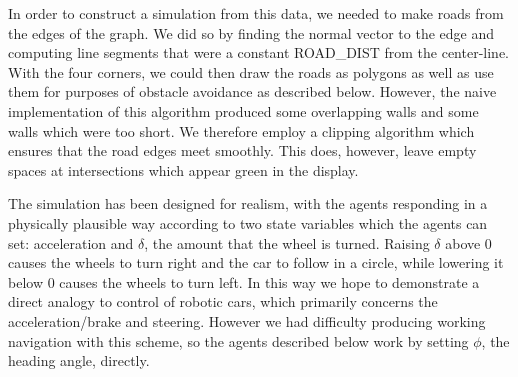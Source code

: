 \documentclass{article}
\begin{document}
In order to construct a simulation from this data, we needed to make
roads from the edges of the graph. We did so by finding the normal
vector to the edge and computing line segments that were a constant
ROAD\_DIST from the center-line. With the four corners, we could then
draw the roads as polygons as well as use them for purposes of
obstacle avoidance as described below. However, the naive
implementation of this algorithm produced some overlapping walls and
some walls which were too short. We therefore employ a clipping
algorithm which ensures that the road edges meet smoothly. This does,
however, leave empty spaces at intersections which appear green in the
display.

The simulation has been designed for realism, with the agents
responding in a physically plausible way according to two state
variables which the agents can set: acceleration and $\delta$, the
amount that the wheel is turned. Raising $\delta$ above 0 causes the
wheels to turn right and the car to follow in a circle, while lowering
it below 0 causes the wheels to turn left. In this way we hope to
demonstrate a direct analogy to control of robotic cars, which
primarily concerns the acceleration/brake and steering. However
we had difficulty producing working navigation with this scheme, so
the agents described below work by setting $\phi$, the heading angle,
directly.
\end{document}
